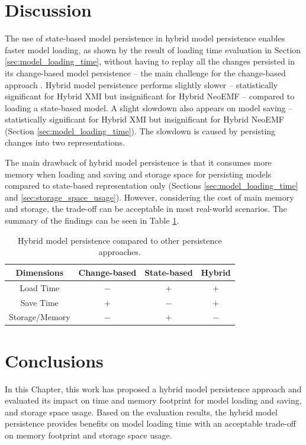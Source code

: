 \section{Discussion}
\label{sec:discussion_5}
The use of state-based model persistence in hybrid model persistence enables faster model loading, as shown by the result of loading time evaluation in Section \ref{sec:model_loading_time}, without having to replay all the changes persisted in its change-based model persistence -- the main challenge for the change-based approach \cite{yohannis2018towards,mens2002state}. 
Hybrid model persistence performs slightly slower -- statistically significant for Hybrid XMI but insignificant for Hybrid NeoEMF -- compared to loading a state-based model. A slight slowdown also appears on model saving -- statistically significant for Hybrid XMI but insignificant for Hybrid NeoEMF (Section \ref{sec:model_loading_time}). The slowdown is caused by persisting changes into two representations. 

The main drawback of hybrid model persistence is that it consumes more memory when loading and saving and storage space for persisting models compared to state-based representation only (Sections \ref{sec:model_loading_time} and \ref{sec:storage_space_usage}). However, considering the cost of main memory and storage, the trade-off can be acceptable in most real-world scenarios. The summary of the findings can be seen in Table \ref{table:persistence_comparison_conclusion}.

\begin{table}[ht]
  \caption{Hybrid model persistence compared to other persistence approaches.}
  \label{table:persistence_comparison_conclusion}
  \centering
  \begin{small}
    \begin{tabular}{ c c c c }
      \hline 
      \textbf{Dimensions} & \textbf{Change-based} & \textbf{State-based} & \textbf{Hybrid}  \\
      \hline 
      Load Time & $-$ & $+$ & $+$ \\
      Save Time & $+$ & $-$ & $+$ \\
      Storage/Memory & $-$ & $+$ & $-$ \\
      \hline 
    \end{tabular}
  \end{small}
\end{table}

\section{Conclusions}
\label{sec:conclusions_5}
In this Chapter, this work has proposed a hybrid model persistence approach and evaluated its impact on time and memory footprint for model loading and saving, and storage space usage.
Based on the evaluation results, the hybrid model persistence provides benefits on model loading time 
with an acceptable trade-off on memory footprint and storage space usage. 